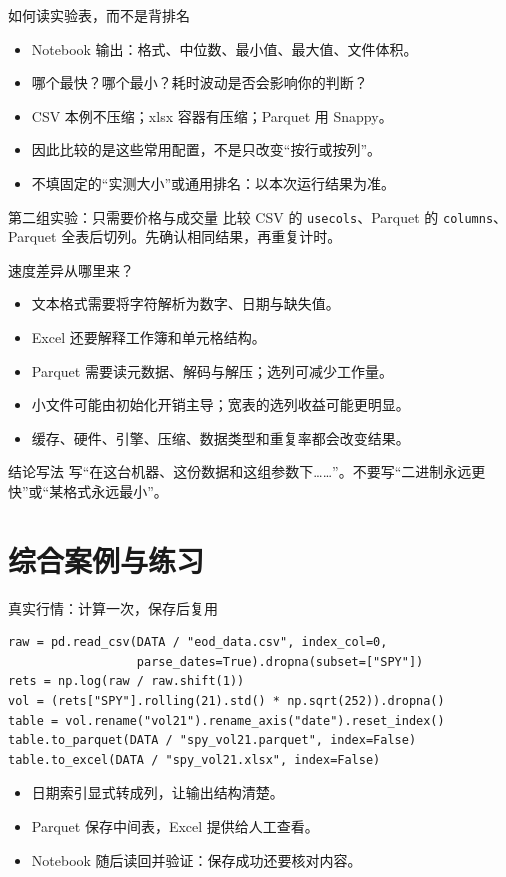 \documentclass[9pt]{ctexbeamer}
\begin{document}
\begin{frame}{如何读实验表，而不是背排名}
\begin{itemize}
\item Notebook 输出：格式、中位数、最小值、最大值、文件体积。
\item 哪个最快？哪个最小？耗时波动是否会影响你的判断？
\item CSV 本例不压缩；xlsx 容器有压缩；Parquet 用 Snappy。
\item 因此比较的是这些常用配置，不是只改变“按行或按列”。
\item 不填固定的“实测大小”或通用排名：以本次运行结果为准。
\end{itemize}
\begin{block}{第二组实验：只需要价格与成交量}
比较 CSV 的 \texttt{usecols}、Parquet 的 \texttt{columns}、Parquet 全表后切列。先确认相同结果，再重复计时。
\end{block}
\end{frame}

\begin{frame}{速度差异从哪里来？}
\begin{itemize}
\item 文本格式需要将字符解析为数字、日期与缺失值。
\item Excel 还要解释工作簿和单元格结构。
\item Parquet 需要读元数据、解码与解压；选列可减少工作量。
\item 小文件可能由初始化开销主导；宽表的选列收益可能更明显。
\item 缓存、硬件、引擎、压缩、数据类型和重复率都会改变结果。
\end{itemize}
\begin{alertblock}{结论写法}
写“在这台机器、这份数据和这组参数下……”。不要写“二进制永远更快”或“某格式永远最小”。
\end{alertblock}
\end{frame}

\section{综合案例与练习}

\begin{frame}[fragile]{真实行情：计算一次，保存后复用}
\begin{lstlisting}
raw = pd.read_csv(DATA / "eod_data.csv", index_col=0,
                  parse_dates=True).dropna(subset=["SPY"])
rets = np.log(raw / raw.shift(1))
vol = (rets["SPY"].rolling(21).std() * np.sqrt(252)).dropna()
table = vol.rename("vol21").rename_axis("date").reset_index()
table.to_parquet(DATA / "spy_vol21.parquet", index=False)
table.to_excel(DATA / "spy_vol21.xlsx", index=False)
\end{lstlisting}
\begin{itemize}
\item 日期索引显式转成列，让输出结构清楚。
\item Parquet 保存中间表，Excel 提供给人工查看。
\item Notebook 随后读回并验证：保存成功还要核对内容。
\end{itemize}
\end{frame}
\end{document}

